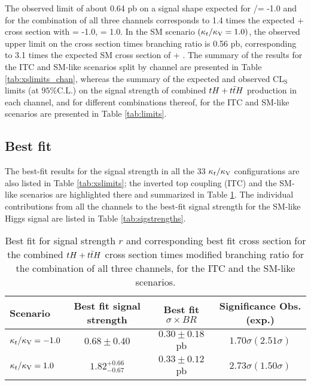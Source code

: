 The observed limit of about 0.64 pb on a signal shape expected for \Ct/\CV = -1.0 and for the combination of all three channels corresponds to 1.4 times the expected \tH + \ttH cross section with \Ct = -1.0, \CV = 1.0. In the SM scenario ${(\kappa_t/\kappa_\text{V} = 1.0)}$, the observed upper limit on the cross section times branching ratio is 0.56 pb, corresponding to 3.1 times the expected SM cross section of \tH + \ttH. The summary of the results for the ITC and SM-like scenarios split by channel are presented in Table \ref{tab:xslimits_chan}, whereas the summary of the expected and observed CL$_\text{S}$ limits (at ${95\% \textrm{C.L.}}$) on the signal strength of combined $tH+t\bar{t}H$ production in each channel, and for different combinations thereof, for the ITC  and SM-like scenarios are presented in Table \ref{tab:limits}.

\subsection{Best fit}

The best-fit results for the signal strength in all the 33 $\kappa_t/\kappa_\text{V}$ configurations are also listed in Table \ref{tab:xslimits}; the inverted top coupling (ITC) and the SM-like scenarios are highlighted there and summarized in Table \ref{tab:fit_results_itc_sm}. The individual contributions from all the channels to the best-fit signal strength for the SM-like Higgs signal are listed in Table \ref{tab:sigstrengths}.

\begin{table}[h!]
\centering
\begin{tabular}{lccc}\hline
Scenario        & Best fit signal strength  & Best fit $\sigma\times BR$ & Significance Obs.(exp.)          \\\hline
$\kappa_t/\kappa_\text{V}=-1.0$  & $0.68\pm0.40$             & $0.30 \pm 0.18$ pb         & $1.70 \sigma (2.51 \sigma) $     \\
$\kappa_t/\kappa_\text{V}=1.0$   & $1.82^{+0.66}_{-0.67}$     & $0.33 \pm 0.12$ pb         & $2.73 \sigma (1.50 \sigma) $     \\\hline
\end{tabular}
\caption[Fit results for the ITC and SM scenarios]{Best fit for signal strength $r$ and corresponding best fit cross section for the combined $tH+t\bar{t}H$ cross section times modified branching ratio for the combination of all three channels, for the ITC and the SM-like scenarios.}
\label{tab:fit_results_itc_sm}
\end{table}

